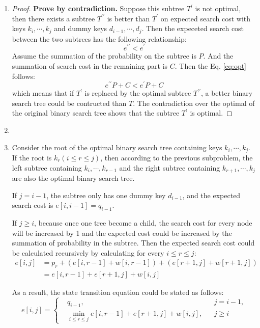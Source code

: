 \documentclass[12pt,a4paper]{article}
\makeatletter
\newtheorem*{solution}{Solution}
\theoremstyle{definition}
\renewenvironment{solution}[1][Solution] {\par\pushQED{\qed}\normalfont\topsep6\p@\@plus6\p@\relax\trivlist\item[\hskip\labelsep\bfseries#1\@addpunct{.}]\ignorespaces}{\popQED\endtrivlist\@endpefalse} \makeatother
\makeatother
\begin{document}
\begin{enumerate}
		\begin{enumerate}
			\item \begin{proof}
			\textbf{Prove by contradiction.} Suppose this subtree $T^\prime$ is not optimal, then there exists a subtree $T^{\prime\prime}$ is better than $T^\prime$ on expected search cost with keys $k_i,\cdots,k_j$ and dummy keys $d_{i-1},\cdots,d_j$. Then the expeceted search cost between the two subtrees has the following relationship:
			\begin{equation}\label{eq:opt}
				e^{\prime\prime}<e^\prime
			\end{equation}
			Assume the summation of the probability on the subtree is $P$. And the summation of search cost in the remaining part is $C$. Then the Eq. \eqref{eq:opt} follows:
			\begin{equation*}
				e^{\prime\prime}P+C<e^\prime P+C
			\end{equation*}
			which means that if $T^\prime$ is replaced by the optimal subtree $T^{\prime\prime}$, a better binary search tree could be contructed than $T$. The contradiction over the optimal of the original binary search tree shows that the subtree $T^\prime$ is optimal.
			\end{proof}
			\item \begin{solution} 
			
			Consider the root of the optimal binary search tree containing keys $k_i,\cdots,k_j$. If the root is $k_r(i\leq r\leq j)$, then according to the previous subproblem, the left subtree containing $k_i,\cdots,k_{r-1}$ and the right subtree containing $k_{r+1},\cdots, k_j$ are also the optimal binary search tree.

			If $j=i-1$, the subtree only has one dummy key $d_{i-1}$, and the expected search cost is $e[i,i-1]=q_{i-1}$.

			If $j\geq i$, because once one tree become a child, the search cost for every node will be increased by 1 and the expected cost could be increased by the summation of probability in the subtree. Then the expected search cost could be calculated recursively by calculating for every $i\leq r\leq j$:
			\begin{align*}
				e[i,j] &= p_r + (e[i,r-1]+w[i,r-1])+(e[r+1,j]+w[r+1,j])\\
				&=e[i,r-1]+e[r+1,j]+w[i,j]
			\end{align*}

			As a result, the state transition equation could be stated as follows:
			\begin{equation*}
				e[i,j]=\left\{\begin{aligned}
					&q_{i-1},&&j = i-1,\\
					&\min_{i\leq r\leq j} e[i,r-1]+e[r+1,j]+w[i,j],&&j\geq i
				\end{aligned}\right.
			\end{equation*}


\end{solution}
\end{enumerate}
\end{enumerate}
\end{document}
